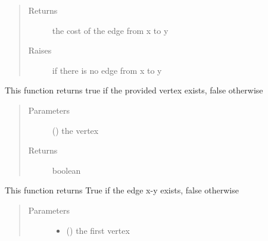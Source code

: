 \documentclass[letterpaper,10pt,english]{sphinxmanual}
\begin{document}
\begin{fulllineitems}
\begin{fulllineitems}
\begin{quote}
\begin{description}
\begin{itemize}
\end{itemize}

\item[{Returns}] \leavevmode
the cost of the edge from x to y

\item[{Raises}] \leavevmode
{} \textendash{} if there is no edge from x to y

\end{description}\end{quote}

\end{fulllineitems}


\begin{fulllineitems}
\label{\detokenize{UndirectedGraph:UndirectedGraph.UndirectedGraph.has_vertex}}
This function returns true if the provided vertex exists, false otherwise
\begin{quote}\begin{description}
\item[{Parameters}] \leavevmode
{} () \textendash{} the vertex

\item[{Returns}] \leavevmode
boolean

\end{description}\end{quote}

\end{fulllineitems}


\begin{fulllineitems}
\label{\detokenize{UndirectedGraph:UndirectedGraph.UndirectedGraph.is_edge}}
This function returns True if the edge x-y exists, false otherwise
\begin{quote}\begin{description}
\item[{Parameters}] \leavevmode\begin{itemize}
\item {} 
 () \textendash{} the first vertex


\end{itemize}
\end{description}
\end{quote}
\end{fulllineitems}
\end{fulllineitems}
\end{document}
